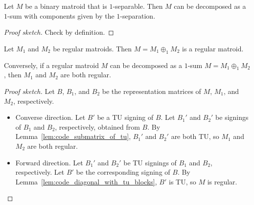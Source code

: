 \begin{lemma}
  \label{lem:code_1_sep_yields_1_sum}
  Let $M$ be a binary matroid that is $1$-separable.
  Then $M$ can be decomposed as a $1$-sum with components given by the $1$-separation.
\end{lemma}

\begin{proof}[Proof sketch]
  Check by definition.
\end{proof}


\begin{lemma}
  \label{lem:code_1_sum_of_regular}
  Let $M_{1}$ and $M_{2}$ be regular matroids. Then $M = M_{1} \oplus_{1} M_{2}$ is a regular matroid.

  Conversely, if a regular matroid $M$ can be decomposed as a $1$-sum $M = M_{1} \oplus_{1} M_{2}$, then $M_{1}$ and $M_{2}$ are both regular.
\end{lemma}

\begin{proof}[Proof sketch]
  Let $B$, $B_{1}$, and $B_{2}$ be the representation matrices of $M$, $M_{1}$, and $M_{2}$, respectively.
  \begin{itemize}
    \item Converse direction. Let $B'$ be a TU signing of $B$. Let $B_{1}'$ and $B_{2}'$ be signings of $B_{1}$ and $B_{2}$, respectively, obtained from $B$. By Lemma~\ref{lem:code_submatrix_of_tu}, $B_{1}'$ and $B_{2}'$ are both TU, so $M_{1}$ and $M_{2}$ are both regular.
    \item Forward direction. Let $B_{1}'$ and $B_{2}'$ be TU signings of $B_{1}$ and $B_{2}$, respectively. Let $B'$ be the corresponding signing of $B$. By Lemma~\ref{lem:code_diagonal_with_tu_blocks}, $B'$ is TU, so $M$ is regular.
  \end{itemize}
\end{proof}


